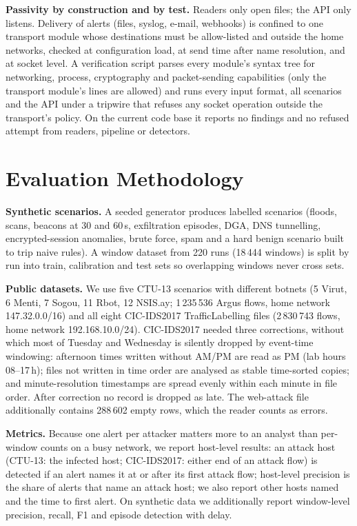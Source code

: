 \documentclass[conference]{IEEEtran}
\begin{document}
\textbf{Passivity by construction and by test.}\label{sec:passive} Readers only open files; the API only listens. Delivery of alerts (files, syslog, e-mail, webhooks) is confined to one transport module whose destinations must be allow-listed and outside the home networks, checked at configuration load, at send time after name resolution, and at socket level. A verification script parses every module's syntax tree for networking, process, cryptography and packet-sending capabilities (only the transport module's lines are allowed) and runs every input format, all scenarios and the API under a tripwire that refuses any socket operation outside the transport's policy. On the current code base it reports no findings and no refused attempt from readers, pipeline or detectors.

\section{Evaluation Methodology}\label{sec:eval}
\textbf{Synthetic scenarios.} A seeded generator produces labelled scenarios (floods, scans, beacons at 30 and 60\,s, exfiltration episodes, DGA, DNS tunnelling, encrypted-session anomalies, brute force, spam and a hard benign scenario built to trip naive rules). A window dataset from 220 runs (18\,444 windows) is split by run into train, calibration and test sets so overlapping windows never cross sets.

\textbf{Public datasets.} We use five CTU-13 scenarios with different botnets (5 Virut, 6 Menti, 7 Sogou, 11 Rbot, 12 NSIS.ay; 1\,235\,536 Argus flows, home network 147.32.0.0/16) and all eight CIC-IDS2017 TrafficLabelling files (2\,830\,743 flows, home network 192.168.10.0/24). CIC-IDS2017 needed three corrections, without which most of Tuesday and Wednesday is silently dropped by event-time windowing: afternoon times written without AM/PM are read as PM (lab hours 08--17\,h); files not written in time order are analysed as stable time-sorted copies; and minute-resolution timestamps are spread evenly within each minute in file order. After correction no record is dropped as late. The web-attack file additionally contains 288\,602 empty rows, which the reader counts as errors.

\textbf{Metrics.} Because one alert per attacker matters more to an analyst than per-window counts on a busy network, we report host-level results: an attack host (CTU-13: the infected host; CIC-IDS2017: either end of an attack flow) is detected if an alert names it at or after its first attack flow; host-level precision is the share of alerts that name an attack host; we also report other hosts named and the time to first alert. On synthetic data we additionally report window-level precision, recall, F1 and episode detection with delay.
\end{document}
